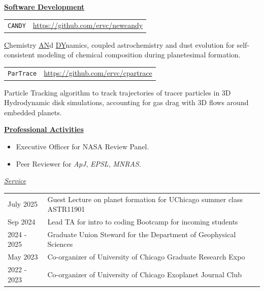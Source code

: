 \documentclass[11pt]{article}
\newcommand{\link}[1]{{\color{blue}\href{#1}{#1}}}
\begin{document}
\vspace{1em}
\pagebreak
\noindent\textbf{\underline{Software Development}}

\noindent
\begin{tabular}{m{1.0in} m{5.0in}}
    \texttt{CANDY} & \link{https://github.com/ervc/newcandy} \\
\end{tabular}

\underline{C}hemistry \underline{AN}d \underline{DY}namics, coupled
astrochemistry and dust evolution for
self-consistent modeling of chemical composition during planetesimal formation.

\noindent
\begin{tabular}{m{1.0in} m{5.0in}}
    \texttt{ParTrace} & \link{https://github.com/ervc/cpartrace} \\
\end{tabular}

Particle Tracking algorithm to track trajectories of tracer particles in 3D
Hydrodynamic disk simulations, accounting for gas drag with 3D flows around
embedded planets.


\vspace{1em}
\noindent\textbf{\underline{Professional Activities}}

\begin{itemize}
    \item Executive Officer for NASA Review Panel.
    \item Peer Reviewer for \textit{ApJ}, \textit{EPSL}, \textit{MNRAS}.
\end{itemize}

\noindent\textit{\underline{Service}}

\noindent
\begin{tabular}{m{1.0in} m{5.0in}}
    July 2025 	&Guest Lecture on planet formation for UChicago summer class
    ASTR11901 \\
    Sep 2024	&Lead TA for intro to coding Bootcamp for incoming students \\
    2024 -	2025 &Graduate Union Steward for the Department of Geophysical
    Sciences \\
    May 2023	&	Co-organizer of University of Chicago Graduate Research Expo \\
    2022 - 2023	&Co-organizer of University of Chicago Exoplanet Journal Club \\
\end{tabular}
\end{document}
